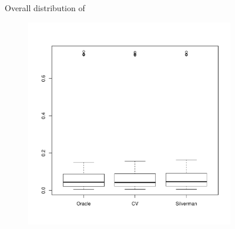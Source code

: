\begin{figure}[htbp]
\begin{subfigure}[t]{0.45\textwidth}
        \label{fig:discussion:overall_centroidbias_boxplot:peak}
    \end{subfigure}
    \caption{Overall distribution of }
    \label{fig:discussion:overall_centroidbias_boxplot}
\end{figure}

\begin{figure}[htbp]
    \centering
    \begin{subfigure}[t]{0.45\textwidth}
        \includegraphics[width=\textwidth]{results/by_overall/relative-centroid-drift-boxplot}
        \label{fig:discussion:overall_centroiddrift_boxplot:unif}
    \end{subfigure}
    \begin{subfigure}[t]{0.45\textwidth}

\end{subfigure}
\end{figure}

